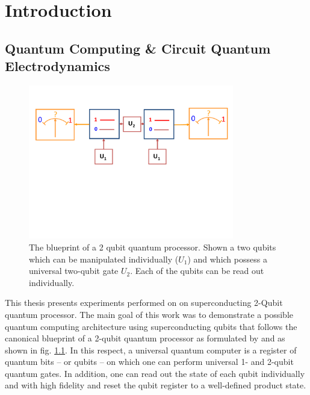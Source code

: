 \chapter{Introduction}


\section{Quantum Computing \& Circuit Quantum Electrodynamics}

\begin{figure}
	\centering
		\includegraphics[width=0.8\textwidth]{./material/papers/grover/submission1/Fig1}
	\caption[Blueprint of a 2-qubit quantum processor]{The blueprint of a 2 qubit quantum processor. Shown a two qubits which can be manipulated individually ($U_1$) and which possess a universal two-qubit gate $U_2$. Each of the qubits can be read out individually.}
	\label{fig:Grover1}
\end{figure}

This thesis presents experiments performed on on superconducting 2-Qubit quantum processor. The main goal of this work was to demonstrate a possible quantum computing architecture using superconducting qubits that follows the canonical blueprint of a 2-qubit quantum processor as formulated by \cite{divincenzo_physical_2000} and as shown in fig. \ref{fig:Grover1}. In this respect, a universal quantum computer is a register of quantum bits -- or qubits -- on which one can perform universal 1- and 2-qubit quantum gates. In addition, one can read out the state of each qubit individually and with high fidelity and reset the qubit register to a well-defined product state.

